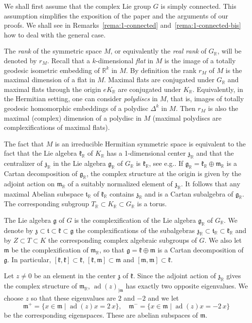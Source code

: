 \documentclass[10pt]{amsart}
\theoremstyle{plain}
\theoremstyle{definition}
\DeclareMathOperator{\ad}{ad}
\newcommand{\bR}{\mathbb{R}}
\newcommand{\fgg}{\mathfrak{g}}
\newcommand{\fk}{\mathfrak{k}}
\newcommand{\fm}{\mathfrak{m}}
\newcommand{\ft}{\mathfrak{t}}
\newcommand{\fz}{\mathfrak{z}}
\newcommand{\rkm}{{r_M}}
\providecommand{\eg}{e.g.}\providecommand{\ie}{i.e.}\providecommand{\etc}{etc.}\providecommand{\resp}{resp.}\providecommand{\cf}{cf.}
\begin{document}
We shall first assume that the complex Lie group $G$ is simply connected. This assumption simplifies the
exposition of the paper and the
arguments of our proofs. We shall see in Remarks~\ref{rema:1-connected}
and~\ref{rema:1-connected-bis} how to deal with the
general case.

The \emph{rank} of the symmetric space $M$, or equivalently the \emph{real rank} of $G_\bR$, will be
denoted by $\rkm$. Recall that a $k$-dimensional \emph{flat} in $M$ is the image of a totally geodesic
isometric embedding of $\bR^k$ in $M$. By definition the rank $\rkm$ of $M$ is the maximal dimension of
a flat in $M$. Maximal flats are conjugated under $G_\bR$ and maximal flats through the origin
$eK_\bR$ are conjugated under $K_\bR$. Equivalently, in the Hermitian setting,
one can consider \emph{polydiscs} in $M$, that is,
images of totally geodesic homomorphic embeddings of a polydisc $\Delta^k$ in $M$. Then $\rkm$ is also
the maximal (complex) dimension of a polydisc in $M$ (maximal polydiscs
are complexifications of maximal flats).

The fact that $M$ is an irreducible Hermitian symmetric space is equivalent to the fact that
the Lie algebra $\fk_\bR$ of $K_\bR$ has a 1-dimensional center $\fz_\bR$ and that the centralizer of
$\fz_\bR$ in the Lie algebra $\fgg_\bR$ of $G_\bR$ is $\fk_\bR$, see \eg \cite{Knapp}. If
$\fgg_\bR=\fk_\bR\oplus\fm_\bR$ is a Cartan decomposition of $\fgg_\bR$, the complex structure at the
origin is given by the adjoint action on $\fm_\bR$ of a suitably normalized element of $\fz_\bR$. It
follows that any maximal Abelian subspace $\ft_\bR$ of $\fk_\bR$ contains $\fz_\bR$ and is a Cartan
subalgebra of $\fgg_\bR$. The corresponding subgroup $T_\bR\subset K_\bR\subset G_\bR$ is a torus.

The Lie algebra $\fgg$ of $G$ is the complexification of the Lie algebra $\fgg_\bR$ of $G_\bR$. We
denote by $\fz\subset\ft\subset\fk \subset\fgg$ the complexifications of the subalgebras
$\fz_\bR\subset\ft_\bR\subset\fk_\bR$ and by $Z\subset T\subset K$ the corresponding complex algebraic
subgroups of $G$. We also let $\fm$ be the complexification of $\fm_\bR$, so that $\fgg=\fk\oplus\fm$
is a Cartan decomposition of $\fgg$. In particular, $[\fk,\fk]\subset\fk$, $[\fk,\fm]\subset\fm$ and $[\fm,\fm]
\subset\fk$.

Let $z\neq 0$ be an element in the center $\fz$ of $\fk$. Since the adjoint action of $\fz_\bR$ gives the
complex structure of $\fm_\bR$, $\ad(z)_{|\fm}$ has exactly two opposite eigenvalues. We
choose $z$ so that these eigenvalues are $2$ and $-2$
and we let
$$
\fm^+ = \{x\in\fm\mid \ad(z)x=2\,x\},\quad
\fm^- = \{x\in\fm\mid \ad(z)x=-2\,x\}
$$
be the corresponding eigenspaces. These are abelian subspaces of $\fm$.
\end{document}
